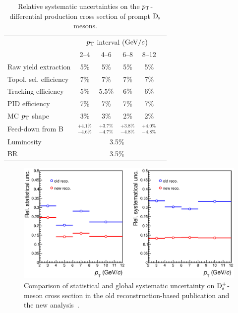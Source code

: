 \begin{table}[!h]
\centering
\begin{tabular}{l|ccccc}
 \hline 
 & \multicolumn{4}{c}{$p_{\rm T}$ interval ($\mathrm{GeV}/c$)}\\
 & 2--4 & 4--6 & 6--8 & 8--12\\
\hline
Raw yield extraction & 5\%& 5\%& 5\%& 5\%\\
Topol. sel. efficiency & 7\%& 7\%& 7\%& 7\%\\
Tracking efficiency & 5\%& 5.5\% & 6\% & 6\%\\
PID efficiency & 7\%& 7\%& 7\%& 7\%\\
MC $p_{\rm T}$ shape   &3\%&3\%&2\%&2\%\\
Feed-down from B & $^{+4.1\%}_{-4.6\%}$& $^{+3.7\%}_{-4.7\%}$& $^{+3.8\%}_{-4.8\%}$& $^{+4.0\%}_{-4.8\%}$\\
Luminosity  & \multicolumn{4}{c}{3.5\%} \\
BR  & \multicolumn{4}{c}{3.5\%} \\
\hline 
\end{tabular}
\caption{Relative systematic uncertainties on the $p_{\rm T}$-differential production
cross section of prompt ${\rm D_s}$ mesons.}
\label{tab:SystDs}
\end{table}

\begin{figure}[!h]
\begin{center}
\includegraphics[width=.99\textwidth]{FigCap4/uncertainties_pass2_pass4.eps}
\caption{Comparison of statistical and global systematic uncertainty on ${\rm D_s^+}$-meson
cross section in the old reconstruction-based publication and the new analysis~\cite{Acharya:2017jgo}.}
\label{fig:UncNewVsOld}
\end{center}
\end{figure}


